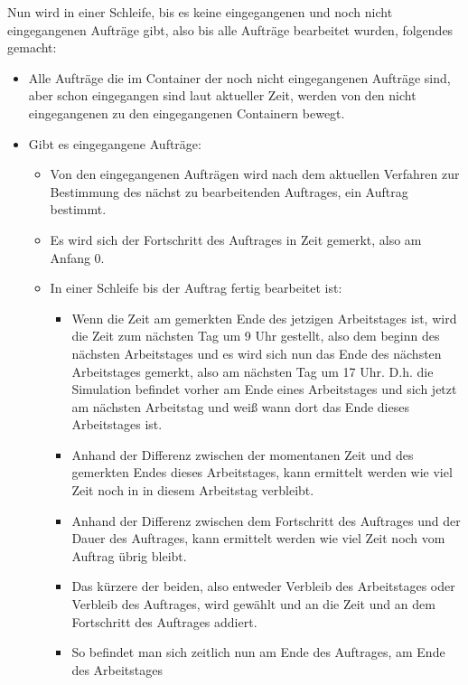 \documentclass[a4paper,10pt,ngerman]{scrartcl}
\begin{document}
Nun wird in einer Schleife, bis es keine eingegangenen
und noch nicht eingegangenen Aufträge gibt,
also bis alle Aufträge bearbeitet wurden, folgendes gemacht:
\begin{itemize}
	\item Alle Aufträge die im Container der noch nicht eingegangenen Aufträge sind,
	      aber schon eingegangen sind laut aktueller Zeit,
    werden von den nicht eingegangenen zu den eingegangenen Containern bewegt.
	\item Gibt es eingegangene Aufträge:
	      \begin{itemize}
		      \item Von den eingegangenen Aufträgen wird nach dem aktuellen Verfahren
		            zur Bestimmung des nächst zu bearbeitenden Auftrages, ein Auftrag bestimmt.
		      \item Es wird sich der Fortschritt des Auftrages in Zeit gemerkt, also am Anfang 0.
		      \item In einer Schleife bis der Auftrag fertig bearbeitet ist:
		            \begin{itemize}
			            \item Wenn die Zeit am gemerkten Ende des jetzigen Arbeitstages ist,
                        wird die Zeit zum nächsten Tag um 9 Uhr gestellt,
			                  also dem beginn des nächsten Arbeitstages und
			                  es wird sich nun das Ende des nächsten Arbeitstages gemerkt,
                        also am nächsten Tag um 17 Uhr.
			                  D.h. die Simulation befindet vorher am Ende eines Arbeitstages
                        und sich jetzt am nächsten Arbeitstag
			                  und weiß wann dort das Ende dieses Arbeitstages ist.
			            \item Anhand der Differenz zwischen der momentanen Zeit
                        und des gemerkten Endes dieses Arbeitstages,
			                  kann ermittelt werden wie viel Zeit noch in in diesem Arbeitstag verbleibt.
			            \item Anhand der Differenz zwischen dem Fortschritt des Auftrages
			                  und der Dauer des Auftrages, kann ermittelt werden
                        wie viel Zeit noch vom Auftrag übrig bleibt.
			            \item Das kürzere der beiden, also entweder Verbleib des Arbeitstages
                         oder Verbleib des Auftrages,
			                  wird gewählt und an die Zeit und an dem Fortschritt des Auftrages addiert.
			            \item So befindet man sich zeitlich nun am Ende des Auftrages, am Ende des Arbeitstages

\end{itemize}
\end{itemize}
\end{itemize}
\end{document}
